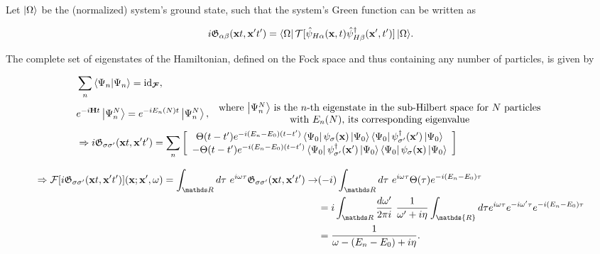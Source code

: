 \documentclass{homework}
\begin{document}
Let $\ket{\Omega}$ be the (normalized) system's ground state, such that the system's Green function can be written as 

\begin{equation}
    i \mathfrak{G}_{\alpha \beta} ({\bf x}t, {\bf x}'t') = {\bra{\Omega} \mathcal{T} [\hat{\psi}_{H \alpha}({\bf x}, t) \hat{\psi}^\dagger_{H \beta}({\bf x}', t')] \ket{\Omega}}.
\end{equation}

The complete set of eigenstates of the Hamiltonian, defined on the Fock space and thus containing any number of particles, is given by 

\begin{equation*}
    \begin{split}
        &\sum_{n} \bra{\Psi_n}\ket{\Psi_n} = \textnormal{id}_{\bm{\mathcal{F}}}, \\
        &e^{-i{\bf H} t} \ket{\Psi_n^N} = e^{-i E_n(N) t} \ket{\Psi_n^N}, \begin{array}{cc}
             \textnormal{ where $\ket{\Psi_n^N}$ is the $n$-th eigenstate in the sub-Hilbert space for $N$ particles} \\
              \textnormal{ with $E_n(N)$, its corresponding eigenvalue} 
        \end{array} \\
        &\Rightarrow i \mathfrak{G}_{\sigma \sigma'} ({\bf x}t, {\bf x}'t') = \sum_{n} \bigg[\begin{array}{c}
             \Theta(t-t') e^{-i(E_n - E_0)(t-t')} \bra{\Psi_0} \psi_{\sigma}({\bf x}) \ket{\Psi_0} \bra{\Psi_0} \psi_{\sigma'}^\dagger({\bf x}') \ket{\Psi_0}\\
             - \Theta(t-t') e^{-i(E_n - E_0)(t-t')} \bra{\Psi_0} \psi_{\sigma'}^\dagger({\bf x}')\ket{\Psi_0} \bra{\Psi_0} \psi_{\sigma}({\bf x}) \ket{\Psi_0}
        \end{array}\bigg]
     \end{split}
\end{equation*}

\begin{equation*}
     \begin{split}
        \Rightarrow \mathcal{F}[i \mathfrak{G}_{\sigma \sigma'} ({\bf x}t, {\bf x}'t')]({\bf x}; {\bf x}',\omega) = \int_{\R} d\tau \blanky e^{i\omega\tau}\mathfrak{G}_{\sigma \sigma'} ({\bf x}t, {\bf x}'t') \rightarrow & (-i) \int_{\R} d\tau \blanky e^{i\omega \tau} \Theta(\tau) e^{-i(E_n-E_0) \tau} \\
        &= i \int_{\R} \frac{d\omega'}{2\pi i} \blanky \frac{1}{\omega'+i\eta} \int_{\mathds{R}} d\tau e^{i\omega \tau}e^{-i\omega' \tau} e^{- i(E_n - E_0)\tau} \\
        &= \frac{1}{\omega - (E_n-E_0) + i\eta}.
     \end{split}
\end{equation*}
\end{document}
